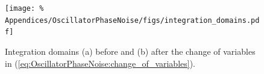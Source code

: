 \begin{figure}
  \centering
  \texttt{[image: \%
    Appendices/OscillatorPhaseNoise/figs/integration\_domains.pdf]}
  \caption[Integration domains]{
    Integration domains (a) before and (b) after
    the change of variables in
    (\ref{eq:OscillatorPhaseNoise:change_of_variables}).}
  \label{fig:OscillatorPhaseNoise:integration_domains}
\end{figure}
